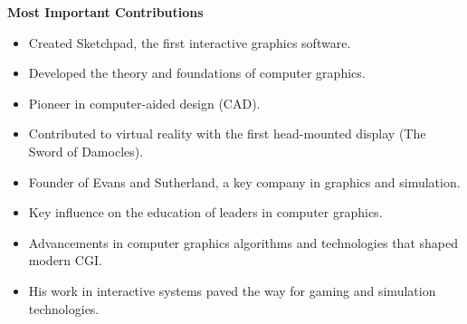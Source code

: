 \documentclass[12pt]{article}
\begin{document}
\textbf{Most Important Contributions}
\begin{multicols}{2}
    \begin{itemize}
        \itemsep 0em
        \item Created Sketchpad, the first interactive graphics software.
        \item Developed the theory and foundations of computer graphics.
        \item Pioneer in computer-aided design (CAD).
        \item Contributed to virtual reality with the first head-mounted display (The Sword of Damocles).
        \item Founder of Evans and Sutherland, a key company in graphics and simulation.
        \item Key influence on the education of leaders in computer graphics.
        \item Advancements in computer graphics algorithms and technologies that shaped modern CGI.
        \item His work in interactive systems paved the way for gaming and simulation technologies.
    \end{itemize}
\end{multicols}

\BgThispage


\nocite{wikipedia_sutherland}
\end{document}
